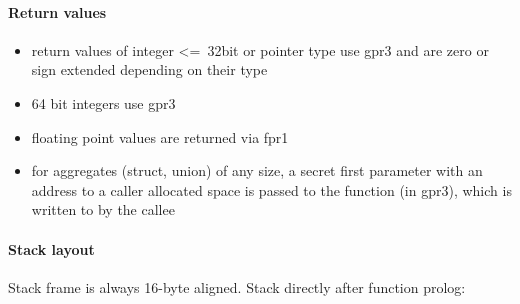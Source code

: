 \paragraph{Return values}

\begin{itemize}
\item return values of integer \textless=\ 32bit or pointer type use gpr3 and are zero or sign extended depending on their type
\item 64 bit integers use gpr3
\item floating point values are returned via fpr1
\item for aggregates (struct, union) of any size, a secret first parameter with an address
to a caller allocated space is passed to the function (in gpr3), which is written to by the callee
\end{itemize}


\paragraph{Stack layout}

Stack frame is always 16-byte aligned.
Stack directly after function prolog:\\

